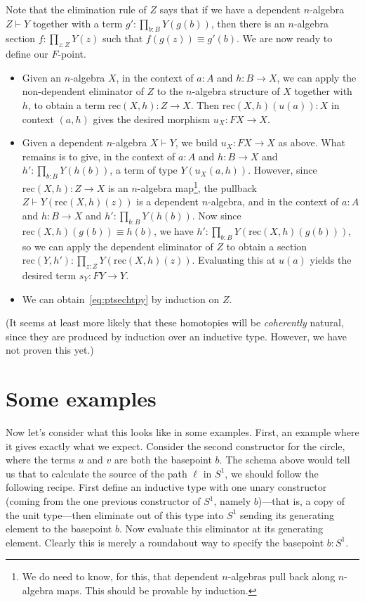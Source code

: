 \documentclass{amsart}
\begin{document}
Note that the elimination rule of $Z$ says that if we have a dependent $n$-algebra $Z\vdash Y$ together with a term $g':\prod_{b:B} Y(g(b))$, then there is an $n$-algebra section $f:\prod_{z:Z} Y(z)$ such that $f(g(z)) \equiv g'(b)$.  We are now ready to define our $F$-point.
\begin{itemize}
\item Given an $n$-algebra $X$, in the context of $a:A$ and $h:B\to X$, we can apply the non-dependent eliminator of $Z$ to the $n$-algebra structure of $X$ together with $h$, to obtain a term $\mathrm{rec}(X,h):Z\to X$.  Then $\mathrm{rec}(X,h)(u(a)):X$ in context $(a,h)$ gives the desired morphism $u_X:F X \to X$.
\item Given a dependent $n$-algebra $X\vdash Y$, we build $u_X:F X \to X$ as above.  What remains is to give, in the context of $a:A$ and $h:B\to X$ and $h':\prod_{b:B} Y(h(b))$, a term of type $Y(u_X(a,h))$.  However, since $\mathrm{rec}(X,h):Z\to X$ is an $n$-algebra map\footnote{We do need to know, for this, that dependent $n$-algebras pull back along $n$-algebra maps.  This should be provable by induction.}, the pullback $Z \vdash Y(\mathrm{rec}(X,h)(z))$ is a dependent $n$-algebra, and in the context of $a:A$ and $h:B\to X$ and $h':\prod_{b:B} Y(h(b))$.  Now since $\mathrm{rec}(X,h)(g(b)) \equiv h(b)$, we have $h':\prod_{b:B} Y(\mathrm{rec}(X,h)(g(b)))$, so we can apply the dependent eliminator of $Z$ to obtain a section $\mathrm{rec}(Y,h'):\prod_{z:Z} Y(\mathrm{rec}(X,h)(z))$.  Evaluating this at $u(a)$ yields the desired term $s_Y:F Y \to Y$.
\item We can obtain~\eqref{eq:ptsechtpy} by induction on $Z$.
\end{itemize}
(It seems at least more likely that these homotopies will be \emph{coherently} natural, since they are produced by induction over an inductive type.  However, we have not proven this yet.)

\section{Some examples}
\label{sec:examples}

Now let's consider what this looks like in some examples.  First, an example where it gives exactly what we expect.  Consider the second constructor for the circle, where the terms $u$ and $v$ are both the basepoint $b$.  The schema above would tell us that to calculate the source of the path $\ell$ in $S^1$, we should follow the following recipe.  First define an inductive type with one unary constructor (coming from the one previous constructor of $S^1$, namely $b$)---that is, a copy of the unit type---then eliminate out of this type into $S^1$ sending its generating element to the basepoint $b$.  Now evaluate this eliminator at its generating element.  Clearly this is merely a roundabout way to specify the basepoint $b:S^1$.
\end{document}
